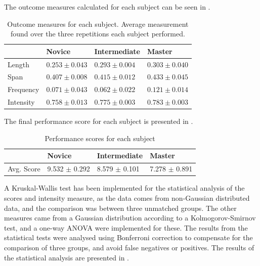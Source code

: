 

The outcome measures calculated for each subject can be seen in .

\begin{table}[h]
	\begin{tabular}{|l|l|l|l|}
		\hline
		& Novice            & Intermediate      & Master            \\ \hline
		Length    & $0.253 \pm 0.043$ & $0.293 \pm 0.004$ & $0.303 \pm 0.040$ \\ \hline
		Span      & $0.407 \pm 0.008$ & $0.415 \pm 0.012$ & $0.433 \pm 0.045$ \\ \hline
		Frequency & $0.071 \pm 0.043$ & $0.062 \pm 0.022$ & $0.121 \pm 0.014$ \\ \hline
		Intensity & $0.758 \pm 0.013$ & $0.775 \pm 0.003$ & $0.783 \pm 0.003$ \\ \hline
	\end{tabular}
	\caption{Outcome measures for each subject. Average measurement found over the three repetitions each subject performed.}
	\label{tab:measures}
\end{table}

The final performance score for each subject is presented in .

\begin{table}[h]
	\begin{tabular}{|l|l|l|l|}
		\hline
				          & Novice                     & Intermediate           & Master                   \\  \hline
		Avg. Score & 9.532 $\pm$ 0.292 & 8.579 $\pm$ 0.101 & 7.278 $\pm$ 0.891 \\ \hline
	\end{tabular}
\caption{Performance scores for each subject}
\label{tab:scores}
\end{table}

A Kruskal-Wallis test has been implemented for the statistical analysis of the scores and intensity measure, as the data comes from non-Gaussian distributed data, and the comparison was between three unmatched groups. The other measures came from a Gaussian distribution according to a Kolmogorov-Smirnov test, and a one-way ANOVA were implemented for these. The results from the statistical tests were analysed using Bonferroni correction to compensate for the comparison of three groups, and avoid false negatives or positives. The results of the statistical analysis are presented in .

